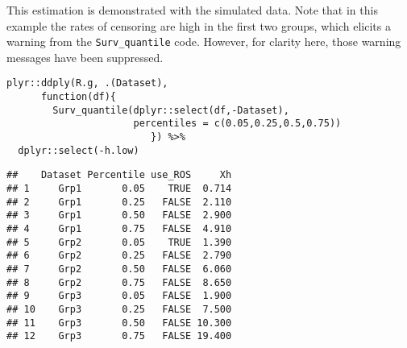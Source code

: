 This estimation is demonstrated with the simulated data.
Note that in this example the rates of censoring are high in the first two groups, which elicits a warning from the \texttt{Surv\_quantile} code.
However, for clarity here, those warning messages have been suppressed.

\begin{snugshade}
\begin{verbatim}
plyr::ddply(R.g, .(Dataset),
      function(df){ 
        Surv_quantile(dplyr::select(df,-Dataset),
                      percentiles = c(0.05,0.25,0.5,0.75))
                         }) %>%
  dplyr::select(-h.low)
\end{verbatim}
\end{snugshade}

\begin{verbatim}
##    Dataset Percentile use_ROS     Xh
## 1     Grp1       0.05    TRUE  0.714
## 2     Grp1       0.25   FALSE  2.110
## 3     Grp1       0.50   FALSE  2.900
## 4     Grp1       0.75   FALSE  4.910
## 5     Grp2       0.05    TRUE  1.390
## 6     Grp2       0.25   FALSE  2.790
## 7     Grp2       0.50   FALSE  6.060
## 8     Grp2       0.75   FALSE  8.650
## 9     Grp3       0.05   FALSE  1.900
## 10    Grp3       0.25   FALSE  7.500
## 11    Grp3       0.50   FALSE 10.300
## 12    Grp3       0.75   FALSE 19.400
\end{verbatim}



